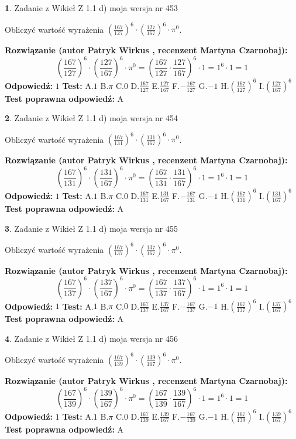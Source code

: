 \documentclass[12pt, a4paper]{article}
\theoremstyle{definition} %
\newtheorem{zad}{}
\newcommand{\zadStart}[1]{\begin{zad}#1\newline}
\newcommand{\zadStop}{\end{zad}}
\newcommand{\rozwStart}[2]{\noindent \textbf{Rozwiązanie (autor #1 , recenzent #2): }\newline}
\newcommand{\rozwStop}{\newline}
\newcommand{\odpStart}{\noindent \textbf{Odpowiedź:}\newline}
\newcommand{\odpStop}{\newline}
\newcommand{\testStart}{\noindent \textbf{Test:}\newline}
\newcommand{\testStop}{\newline}
\newcommand{\kluczStart}{\noindent \textbf{Test poprawna odpowiedź:}\newline}
\newcommand{\kluczStop}{\newline}
\begin{document}
\zadStart{Zadanie z Wikieł Z 1.1 d) moja wersja nr 453}

Obliczyć wartość wyrażenia $(\frac{167}{127})^{6} \cdot (\frac{127}{167})^{6} \cdot \pi^{0}$.
\zadStop
\rozwStart{Patryk Wirkus}{Martyna Czarnobaj}
$$(\frac{167}{127})^{6} \cdot (\frac{127}{167})^{6} \cdot \pi^{0} = (\frac{167}{127} \cdot \frac{127}{167})^{6} \cdot 1 = 1^{6} \cdot 1 = 1$$
\rozwStop
\odpStart
$1$
\odpStop
\testStart
A.$1$ B.$\pi$ C.$0$ D.$\frac{167}{127}$ E.$\frac{127}{167}$
F.$-\frac{167}{127}$ G.$-1$
H.$(\frac{167}{127})^{6}$
I.$(\frac{127}{167})^{6}$
\testStop
\kluczStart
A
\kluczStop



\zadStart{Zadanie z Wikieł Z 1.1 d) moja wersja nr 454}

Obliczyć wartość wyrażenia $(\frac{167}{131})^{6} \cdot (\frac{131}{167})^{6} \cdot \pi^{0}$.
\zadStop
\rozwStart{Patryk Wirkus}{Martyna Czarnobaj}
$$(\frac{167}{131})^{6} \cdot (\frac{131}{167})^{6} \cdot \pi^{0} = (\frac{167}{131} \cdot \frac{131}{167})^{6} \cdot 1 = 1^{6} \cdot 1 = 1$$
\rozwStop
\odpStart
$1$
\odpStop
\testStart
A.$1$ B.$\pi$ C.$0$ D.$\frac{167}{131}$ E.$\frac{131}{167}$
F.$-\frac{167}{131}$ G.$-1$
H.$(\frac{167}{131})^{6}$
I.$(\frac{131}{167})^{6}$
\testStop
\kluczStart
A
\kluczStop



\zadStart{Zadanie z Wikieł Z 1.1 d) moja wersja nr 455}

Obliczyć wartość wyrażenia $(\frac{167}{137})^{6} \cdot (\frac{137}{167})^{6} \cdot \pi^{0}$.
\zadStop
\rozwStart{Patryk Wirkus}{Martyna Czarnobaj}
$$(\frac{167}{137})^{6} \cdot (\frac{137}{167})^{6} \cdot \pi^{0} = (\frac{167}{137} \cdot \frac{137}{167})^{6} \cdot 1 = 1^{6} \cdot 1 = 1$$
\rozwStop
\odpStart
$1$
\odpStop
\testStart
A.$1$ B.$\pi$ C.$0$ D.$\frac{167}{137}$ E.$\frac{137}{167}$
F.$-\frac{167}{137}$ G.$-1$
H.$(\frac{167}{137})^{6}$
I.$(\frac{137}{167})^{6}$
\testStop
\kluczStart
A
\kluczStop



\zadStart{Zadanie z Wikieł Z 1.1 d) moja wersja nr 456}

Obliczyć wartość wyrażenia $(\frac{167}{139})^{6} \cdot (\frac{139}{167})^{6} \cdot \pi^{0}$.
\zadStop
\rozwStart{Patryk Wirkus}{Martyna Czarnobaj}
$$(\frac{167}{139})^{6} \cdot (\frac{139}{167})^{6} \cdot \pi^{0} = (\frac{167}{139} \cdot \frac{139}{167})^{6} \cdot 1 = 1^{6} \cdot 1 = 1$$
\rozwStop
\odpStart
$1$
\odpStop
\testStart
A.$1$ B.$\pi$ C.$0$ D.$\frac{167}{139}$ E.$\frac{139}{167}$
F.$-\frac{167}{139}$ G.$-1$
H.$(\frac{167}{139})^{6}$
I.$(\frac{139}{167})^{6}$
\testStop
\kluczStart
A
\kluczStop
\end{document}

